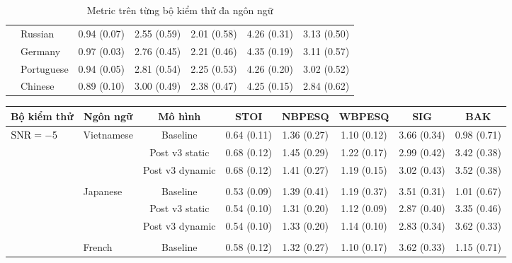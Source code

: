 \begin{table}[h]
\begin{tabular}{l l c c c c c}
				& Russian        & 0.94 (0.07)   & 2.55 (0.59)   & 2.01 (0.58)   & 4.26 (0.31)   & 3.13 (0.50) \\
				& Germany        & 0.97 (0.03)   & 2.76 (0.45)   & 2.21 (0.46)   & 4.35 (0.19)   & 3.11 (0.57) \\
				& Portuguese       & 0.94 (0.05)   & 2.81 (0.54)   & 2.25 (0.53)   & 4.26 (0.20)   & 3.02 (0.52) \\
				& Chinese        & 0.89 (0.10)   & 3.00 (0.49)   & 2.38 (0.47)   & 4.25 (0.15)   & 2.84 (0.62) \\
				\hline
			\end{tabular}
			\caption{Metric trên từng bộ kiểm thử đa ngôn ngữ}
			\label{re::multilingual_baseline}
		\end{table}
	
		\begin{sidewaystable}
			\centering
			\begin{subtable}{\textwidth}
				\centering
				\begin{tabular}{llcccccc}
					\hline
					\multicolumn{1}{c}{\textbf{Bộ kiểm thử}}	& \multicolumn{1}{c}{\textbf{Ngôn ngữ}}	& \textbf{Mô hình}	& \textbf{STOI}	& \textbf{NBPESQ}	& \textbf{WBPESQ}	& \textbf{SIG}	& \textbf{BAK} \\
					\hline
					\multirow{27}{*}{$\text{SNR}=-5$}       & \multirow{3}{*}{Vietnamese}     &Baseline       & 0.64 (0.11)   & 1.36 (0.27)   & 1.10 (0.12)   & 3.66 (0.34)   & 0.98 (0.71) \\
					&               &Post v3 static & 0.68 (0.12)   & 1.45 (0.29)   & 1.22 (0.17)   & 2.99 (0.42)   & 3.42 (0.38) \\
					&               &Post v3 dynamic        & 0.68 (0.12)   & 1.41 (0.27)   & 1.19 (0.15)   & 3.02 (0.43)   & 3.52 (0.38) \\
					&&&&&&&\\
					& \multirow{3}{*}{Japanese}     &Baseline       & 0.53 (0.09)   & 1.39 (0.41)   & 1.19 (0.37)   & 3.51 (0.31)   & 1.01 (0.67) \\
					&               &Post v3 static & 0.54 (0.10)   & 1.31 (0.20)   & 1.12 (0.09)   & 2.87 (0.40)   & 3.35 (0.46) \\
					&               &Post v3 dynamic        & 0.54 (0.10)   & 1.33 (0.20)   & 1.14 (0.10)   & 2.83 (0.34)   & 3.62 (0.33) \\
					&&&&&&&\\
					& \multirow{3}{*}{French}       &Baseline       & 0.58 (0.12)   & 1.32 (0.27)   & 1.10 (0.17)   & 3.62 (0.33)   & 1.15 (0.71) \\

\end{tabular}
\end{subtable}
\end{sidewaystable}
